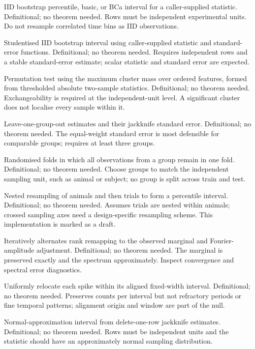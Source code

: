 {IID bootstrap percentile, basic, or BCa interval for a caller-supplied statistic.}
{Definitional; no theorem needed.}
{Rows must be independent experimental units. Do not resample correlated time bins as IID observations.}

{Studentised IID bootstrap interval using caller-supplied statistic and standard-error functions.}
{Definitional; no theorem needed.}
{Requires independent rows and a stable standard-error estimate; scalar statistic and standard error are expected.}

{Permutation test using the maximum cluster mass over ordered features, formed from thresholded absolute two-sample statistics.}
{Definitional; no theorem needed.}
{Exchangeability is required at the independent-unit level. A significant cluster does not localise every sample within it.}

{Leave-one-group-out estimates and their jackknife standard error.}
{Definitional; no theorem needed.}
{The equal-weight standard error is most defensible for comparable groups; requires at least three groups.}

{Randomised folds in which all observations from a group remain in one fold.}
{Definitional; no theorem needed.}
{Choose groups to match the independent sampling unit, such as animal or subject; no group is split across train and test.}

{Nested resampling of animals and then trials to form a percentile interval.}
{Definitional; no theorem needed.}
{Assumes trials are nested within animals; crossed sampling axes need a design-specific resampling scheme. This implementation is marked as a draft.}

{Iteratively alternates rank remapping to the observed marginal and Fourier-amplitude adjustment.}
{Definitional; no theorem needed.}
{The marginal is preserved exactly and the spectrum approximately. Inspect convergence and spectral error diagnostics.}

{Uniformly relocate each spike within its aligned fixed-width interval.}
{Definitional; no theorem needed.}
{Preserves counts per interval but not refractory periods or fine temporal patterns; alignment origin and window are part of the null.}

{Normal-approximation interval from delete-one-row jackknife estimates.}
{Definitional; no theorem needed.}
{Rows must be independent units and the statistic should have an approximately normal sampling distribution.}

